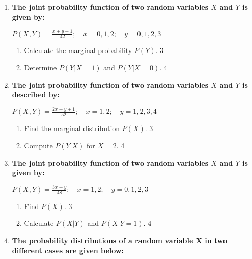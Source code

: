 \documentclass[a4paper,oneside, margin=1.4in]{book}
\begin{document}
\begin{enumerate}
\begin{enumerate}
\end{enumerate}

  
  \item
  \textbf{The joint probability function of two random variables \( X \) and \( Y \) is given by:}
  
  \begin{center}
  \( \displaystyle P(X,Y) = \frac{x + y + 1}{42}; \quad x = 0, 1, 2; \quad y = 0, 1, 2, 3 \)
  \end{center}
 
  \begin{enumerate}
    \item
    	Calculate the marginal probability \( P(Y) \). \hfill 3
    \item
     	Determine \( P(Y \vert X = 1) \) and \( P(Y \vert X = 0) \). \hfill 4
  \end{enumerate}

  \item
  \textbf{The joint probability function of two random variables \( X \) and \( Y \) is described by:}
  
  \begin{center}
  \( \displaystyle P(X,Y) = \frac{2x + y + 1}{52}; \quad x = 1, 2; \quad y = 1, 2, 3, 4 \)
  \end{center}
 
  \begin{enumerate}
    \item
    	Find the marginal distribution \( P(X) \). \hfill 3
    \item
     	Compute \( P(Y \vert X) \) for \( X = 2 \). \hfill 4
  \end{enumerate}
  
  \item
  \textbf{The joint probability function of two random variables \( X \) and \( Y \) is given by:}
  
  \begin{center}
  \( \displaystyle P(X,Y) = \frac{3x + y}{48}; \quad x = 1, 2; \quad y = 0, 1, 2, 3 \)
  \end{center}
 
  \begin{enumerate}
    \item
    	Find \( P(X) \). \hfill 3
    \item
     	Calculate \( P(X \vert Y) \) and \( P(X \vert Y=1) \). \hfill 4
  \end{enumerate}



   \item
	  \textbf{The probability distributions of a random variable X in two different cases are given below:} 
	  

\end{enumerate}
\end{document}
